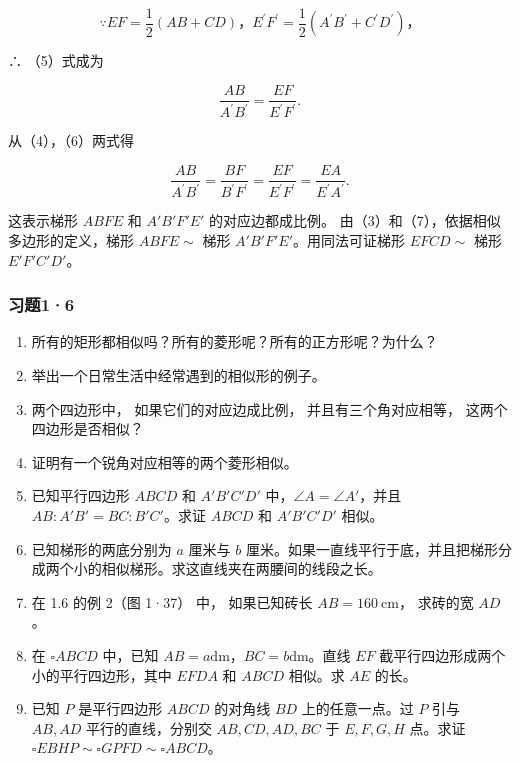 \[
\because E F = \frac {1}{2} (A B + C D)\text{，} E ^ {\prime} F ^ {\prime} = \frac {1}{2} (A ^ {\prime} B ^ {\prime} + C ^ {\prime} D ^ {\prime})\text{，}
\]

∴ （5）式成为

\[
\frac {A B}{A ^ {\prime} B ^ {\prime}} = \frac {E F}{E ^ {\prime} F ^ {\prime}}. \tag {6}
\]

从（4），（6）两式得

\[
\frac {A B}{A ^ {\prime} B ^ {\prime}} = \frac {B F}{B ^ {\prime} F ^ {\prime}} = \frac {E F}{E ^ {\prime} F ^ {\prime}} = \frac {E A}{E ^ {\prime} A ^ {\prime}}. \tag {7}
\]

这表示梯形 \(ABFE\) 和 \(A'B'F'E'\) 的对应边都成比例。
由（3）和（7），依据相似多边形的定义，梯形 \(ABFE \sim\) 梯形
\(A'B'F'E'\)。用同法可证梯形 \(EFCD \sim\) 梯形 \(E'F'C'D'\)。

\subsubsection{习题1·6}

\begin{enumerate}
\item
  所有的矩形都相似吗？所有的菱形呢？所有的正方形呢？为什么？
\item
  举出一个日常生活中经常遇到的相似形的例子。
\item
  两个四边形中， 如果它们的对应边成比例， 并且有三个角对应相等，
  这两个四边形是否相似？
\item
  证明有一个锐角对应相等的两个菱形相似。
\item
  已知平行四边形 \(ABCD\) 和 \(A'B'C'D'\)
  中，\(\angle A = \angle A'\)，并且 \(AB: A'B' = BC: B'C'\)。求证
  \(ABCD\) 和 \(A'B'C'D'\) 相似。
\item
  已知梯形的两底分别为 \(a\) 厘米与 \(b\)
  厘米。如果一直线平行于底，并且把梯形分成两个小的相似梯形。求这直线夹在两腰间的线段之长。
\item
  在 1.6 的例 2（图 1·37） 中， 如果已知砖长 \(AB = 160 \mathrm{~cm}\)，
  求砖的宽 \(AD\)。
\item
  在 \(\square ABCD\) 中，已知
  \(AB = a\mathrm{dm}\)，\(BC = b\mathrm{dm}\)。直线 \(EF\)
  截平行四边形成两个小的平行四边形，其中 \(EFDA\) 和 \(ABCD\) 相似。求
  \(AE\) 的长。
\item
  已知 \(P\) 是平行四边形 \(ABCD\) 的对角线 \(BD\) 上的任意一点。过
  \(P\) 引与 \(AB, AD\) 平行的直线，分别交 \(AB, CD, AD, BC\) 于
  \(E, F, G, H\) 点。求证
  \(\square EBHP \sim \square GPFD \sim \square ABCD\)。
\end{enumerate}


